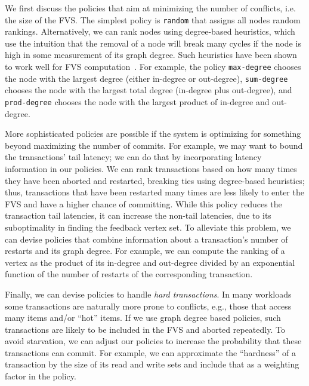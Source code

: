 We first discuss the policies that aim at minimizing the number of conflicts, i.e. the size of the FVS. The simplest policy is \texttt{random} that assigns all nodes random rankings. Alternatively, we can rank nodes using degree-based heuristics, which use the intuition that the removal of a node will break many cycles if the node is high in some measurement of its graph degree. Such heuristics have  been shown to work well for FVS computation~\cite{cutello2015targeting}. For example, the policy \texttt{max-degree} chooses the node with the largest degree (either in-degree or out-degree), \texttt{sum-degree} chooses the node with the largest total degree (in-degree plus out-degree), and \texttt{prod-degree} chooses the node with the largest product of in-degree and out-degree. 

More sophisticated policies are possible if the system is optimizing for something beyond maximizing the number of commits. For example, we may want to bound the transactions' tail latency; we can do that by incorporating latency information in our policies. We can rank transactions based on how many times they have been aborted and restarted, breaking ties using degree-based heuristics; thus, transactions that have been restarted many times are less likely to enter the FVS and have a higher chance of committing. While this policy reduces the transaction tail latencies, it can increase the non-tail latencies, due to its suboptimality in finding the feedback vertex set. To alleviate this problem, we can devise policies that combine information about a transaction's number of restarts and its graph degree. For example, we can compute the ranking of a vertex as the product of its in-degree and out-degree divided by an exponential function of the number of restarts of the corresponding transaction. 

Finally, we can devise policies to handle \emph{hard transactions}. In many workloads some transactions are naturally more prone to conflicts, e.g., those that access many items and/or ``hot'' items. If we use graph degree based policies, such transactions are likely to be included in the FVS and aborted repeatedly. To avoid starvation, we can adjust our policies to increase the probability that these transactions can commit. For example, we can approximate the ``hardness'' of a transaction by the size of its read and write sets and include that as a weighting factor in the policy. 





